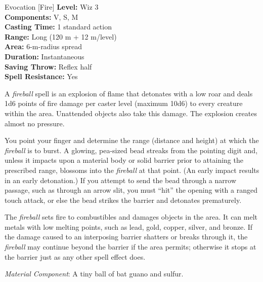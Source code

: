 {Evocation [Fire]}
{
	\textbf{Level:}
	Wiz 3\\
	\textbf{Components:}
	V, S, M\\
	\textbf{Casting Time:}
	1 standard action\\
	\textbf{Range:}
	Long (120 m + 12 m/level)\\
	\textbf{Area:}
	6-m-radius spread\\
	\textbf{Duration:}
	Instantaneous\\
	\textbf{Saving Throw:}
	Reflex half\\
	\textbf{Spell Resistance:}
	Yes\\
}
{
	A \emph{fireball} spell is an explosion of flame that detonates with a low roar and deals 1d6 points of fire damage per caster level (maximum 10d6) to every creature within the area. Unattended objects also take this damage. The explosion creates almost no pressure.

	You point your finger and determine the range (distance and height) at which the \emph{fireball} is to burst. A glowing, pea-sized bead streaks from the pointing digit and, unless it impacts upon a material body or solid barrier prior to attaining the prescribed range, blossoms into the \emph{fireball} at that point. (An early impact results in an early detonation.) If you attempt to send the bead through a narrow passage, such as through an arrow slit, you must ``hit'' the opening with a ranged touch attack, or else the bead strikes the barrier and detonates prematurely.

	The \emph{fireball} sets fire to combustibles and damages objects in the area. It can melt metals with low melting points, such as lead, gold, copper, silver, and bronze. If the damage caused to an interposing barrier shatters or breaks through it, the \emph{fireball} may continue beyond the barrier if the area permits; otherwise it stops at the barrier just as any other spell effect does.

	\textit{Material Component}:
	A tiny ball of bat guano and sulfur.

}
